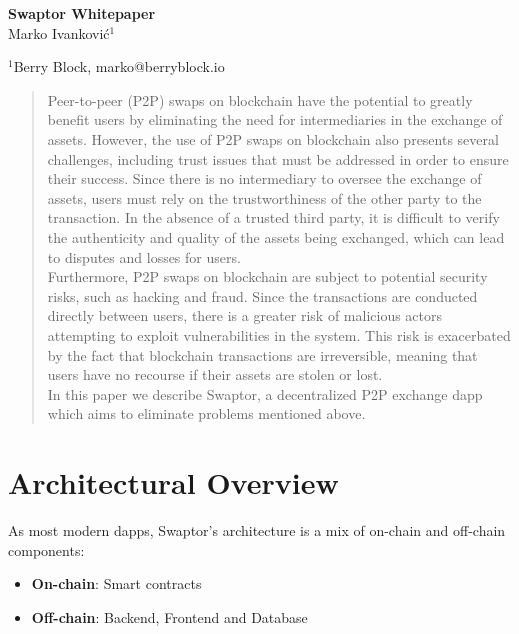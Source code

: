 \documentclass[12pt]{article}
\begin{document}
\baselineskip 11pt


\begin{center}
  \textbf{\Large Swaptor Whitepaper} \\

  \vspace{1.5cc}
  { \sc Marko Ivanković$^{1}$}\\

  \vspace{0.3 cm}

  {\small $^{1}$Berry Block, marko@berryblock.io}
\end{center}
\vspace{1.5cc}

\begin{abstract}
  \noindent  Peer-to-peer (P2P) swaps on blockchain have the potential to greatly benefit users by eliminating the need for intermediaries in the exchange of assets. However, the use of P2P swaps on blockchain also presents several challenges, including trust issues that must be addressed in order to ensure their success.  Since there is no intermediary to oversee the exchange of assets, users must rely on the trustworthiness of the other party to the transaction. In the absence of a trusted third party, it is difficult to verify the authenticity and quality of the assets being exchanged, which can lead to disputes and losses for users.
  \\ \indent Furthermore, P2P swaps on blockchain are subject to potential security risks, such as hacking and fraud. Since the transactions are conducted directly between users, there is a greater risk of malicious actors attempting to exploit vulnerabilities in the system. This risk is exacerbated by the fact that blockchain transactions are irreversible, meaning that users have no recourse if their assets are stolen or lost.
  \\ \indent In this paper we describe Swaptor, a decentralized P2P exchange dapp which aims to eliminate problems mentioned above.

  \vspace{0.95cc}
\end{abstract}

\newpage

\tableofcontents

\newpage

\section{Architectural Overview} \label{form}
\indent As most modern dapps, Swaptor's architecture is a mix of on-chain and off-chain components:
\begin{itemize}
  \item \textbf{On-chain}: Smart contracts
  \item \textbf{Off-chain}: Backend, Frontend and Database
\end{itemize}
\end{document}
